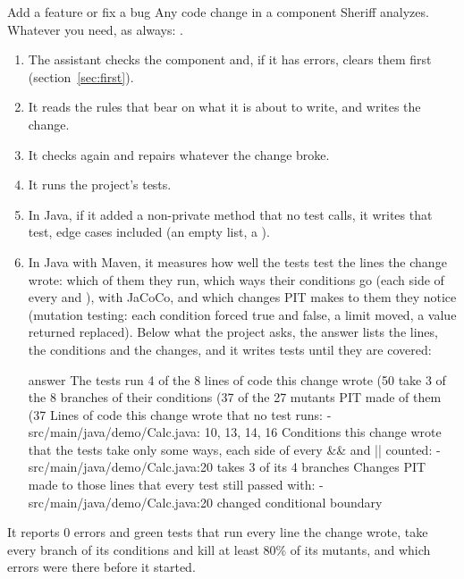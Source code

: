 \documentclass[11pt,a4paper]{article}
\begin{document}
\begin{play}{Add a feature or fix a bug}
\when Any code change in a component Sheriff analyzes.
\asks Whatever you need, as always: .
\happens
\begin{enumerate}
  \item The assistant checks the component and, if it has errors, clears them
        first (section~\ref{sec:first}).
  \item It reads the rules that bear on what it is about to write, and writes
        the change.
  \item It checks again and repairs whatever the change broke.
  \item It runs the project's tests.
  \item In Java, if it added a non-private method that no test calls, it writes
        that test, edge cases included (an empty list, a ).
  \item In Java with Maven, it measures how well the tests test the lines the
        change wrote: which of them they run, which ways their conditions go
        (each side of every \code{&&} and \code{||}), with JaCoCo, and which
        changes PIT makes to them they notice (mutation testing: each
        condition forced true and false, a limit moved, a value returned
        replaced). Below what the project asks, the answer lists the lines,
        the conditions and the changes, and it writes tests until they are
        covered:
\begin{command}[basicstyle=\ttfamily\footnotesize]{answer}
The tests run 4 of the 8 lines of code this change wrote (50%
take 3 of the 8 branches of their conditions (37%
of the 27 mutants PIT made of them (37%
Lines of code this change wrote that no test runs:
  - src/main/java/demo/Calc.java: 10, 13, 14, 16
Conditions this change wrote that the tests take only some ways, each side of
every && and || counted:
  - src/main/java/demo/Calc.java:20 takes 3 of its 4 branches
Changes PIT made to those lines that every test still passed with:
  - src/main/java/demo/Calc.java:20 changed conditional boundary
\end{command}
\end{enumerate}
\done It reports 0 errors and green tests that run every line the change wrote,
take every branch of its conditions and kill at least 80\% of its mutants, and
which errors were there before it started.
\end{play}
\end{document}
